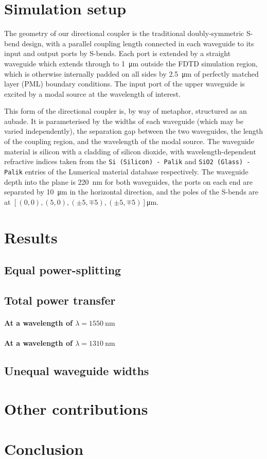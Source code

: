 \documentclass[10pt, a4paper]{article}
\begin{document}
\section{Simulation setup}

The geometry of our directional coupler is the traditional doubly-symmetric S-bend design,
with a parallel coupling length connected in each waveguide to its input and output ports by S-bends.
Each port is extended by a straight waveguide which extends through to \SI{1}{\um} outside the FDTD simulation region,
which is otherwise internally padded on all sides by \SI{2.5}{\um} of perfectly matched layer (PML) boundary conditions.
The input port of the upper waveguide is excited by a modal source at the wavelength of interest.

This form of the directional coupler is, by way of metaphor, structured as an aubade.
It is parameterised by the widths of each waveguide (which may be varied independently),
the separation gap between the two waveguides, the length of the coupling region,
and the wavelength of the modal source.
The waveguide material is silicon with a cladding of silicon dioxide,
with wavelength-dependent refractive indices taken from the \texttt{Si (Silicon) - Palik}
and \texttt{SiO2 (Glass) - Palik} entries of the Lumerical material database respectively.
The waveguide depth into the plane is \SI{220}{\nm} for both waveguides,
the ports on each end are separated by \SI{10}{\um} in the horizontal direction,
and the poles of the S-bends are at \([(0,0), (5, 0), (\pm 5, \mp 5), (\pm 5, \mp 5)]\)\unit{\um}.


\section{Results}
\subsection{Equal power-splitting}

\subsection{Total power transfer}

\paragraph{At a wavelength of \(\lambda=\SI{1550}{\nm}\)}

\paragraph{At a wavelength of \(\lambda=\SI{1310}{\nm}\)}

\subsection{Unequal waveguide widths}

\section{Other contributions}


\section{Conclusion}


\printbibliography
\end{document}
